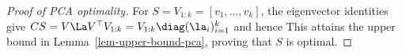 \begin{proof}[Proof of PCA optimality]
	For $S=V_{1:k}=[v_1,\ldots,v_k]$, the eigenvector identities give $CS = V \La V^\top V_{1:k} = V_{1:k} \diag(\la_i)_{i=1}^k$ and hence
	This attains the upper bound in Lemma~\ref{lem-upper-bound-pca}, proving that $S$ is optimal.
\end{proof}


             
         
      
                                                                                                                                     
   
                                                                      
           
